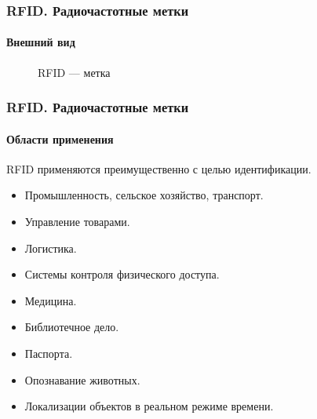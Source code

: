 \begin{frame}
    \frametitle{RFID. Радиочастотные метки}
    \framesubtitle{Внешний вид}
    
    \begin{figure}
        \begin{center}
            \caption{RFID --- метка}\label{pict:rfid}
        \end{center}
    \end{figure} 
    
\end{frame}


\begin{frame}
    \frametitle{RFID. Радиочастотные метки}
    \framesubtitle{Области применения}
    
    RFID применяются преимущественно с целью идентификации.
    \begin{itemize}
        \item Промышленность, сельское хозяйство, транспорт.
        \item Управление товарами.
        \item Логистика.
        \item Системы контроля физического доступа.
        \item Медицина.
        \item Библиотечное дело.
        \item Паспорта.
        \item Опознавание животных.
        \item Локализации объектов в реальном режиме времени.
    \end{itemize} 
\end{frame}


